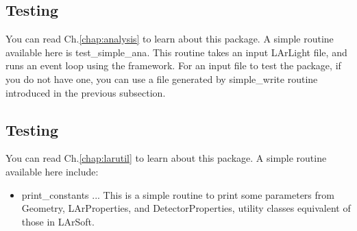 \subsection{Testing \Analysis}
You can read Ch.\ref{chap:analysis} to learn about this package.
A simple routine available here is {\ttfamily test\_simple\_ana}. This routine takes an input
LArLight \ROOT file, and runs an event loop using the \Analysis framework. For an input file to test
the package, if you do not have one, you can use a file generated by {\ttfamily simple\_write} routine
introduced in the previous subsection.

\subsection{Testing \LArUtil}
You can read Ch.\ref{chap:larutil} to learn about this package. 
A simple routine available here include:
\begin{itemize}
\item {\ttfamily print\_constants} ... This is a simple routine to print some parameters from {\ttfamily Geometry}, {\ttfamily LArProperties}, and {\ttfamily DetectorProperties}, utility classes equivalent of those in LArSoft.
\end{itemize}

